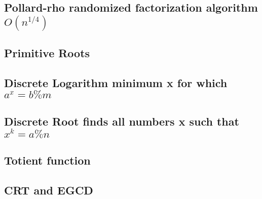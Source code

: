 \subsection{Pollard-rho randomized factorization algorithm ${O(n^{1/4})}$}
\vspace{-2.3ex}
\raggedbottom
\vspace{-3.3ex}
\hrulefill
\vspace{-1ex}
\subsection{Primitive Roots}
\vspace{-2.3ex}
\raggedbottom
\vspace{-3.3ex}
\hrulefill
\vspace{-1ex}
\subsection{Discrete Logarithm minimum x for which ${a^x = b \% m}$}
\vspace{-2.3ex}
\raggedbottom
\vspace{-3.3ex}
\hrulefill
\vspace{-1ex}
\subsection{Discrete Root finds all numbers x such that ${x^k = a \% n}$}
\vspace{-2.3ex}
\raggedbottom
\vspace{-3.3ex}
\hrulefill
\vspace{-1ex}
\subsection{Totient function}
\vspace{-2.3ex}
\raggedbottom
\vspace{-3.3ex}
\hrulefill
\vspace{-1ex}
\subsection{CRT and EGCD}
\vspace{-2.3ex}
\raggedbottom
\vspace{-3.3ex}
\hrulefill
\vspace{-1ex}
